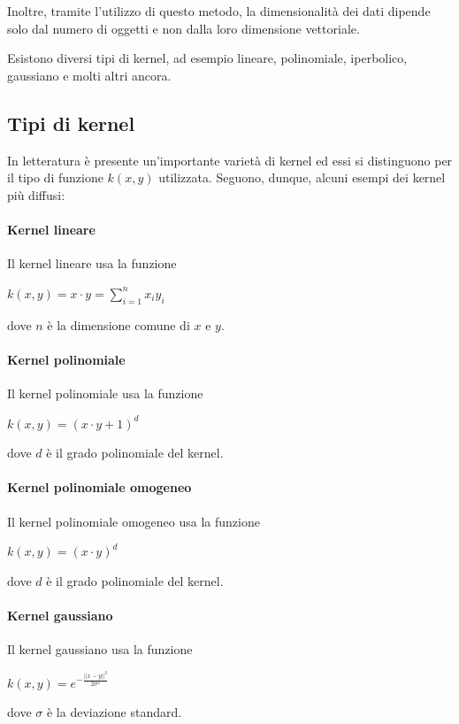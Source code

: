 \documentclass[12pt]{report}
\theoremstyle{definition}
\begin{document}
Inoltre, tramite l'utilizzo di questo metodo, la dimensionalità dei dati dipende solo dal numero di oggetti e non dalla loro dimensione vettoriale.

Esistono diversi tipi di kernel, ad esempio lineare, polinomiale, iperbolico, gaussiano e molti altri ancora.

\subsection{Tipi di kernel}
In letteratura è presente un'importante varietà di kernel ed essi si distinguono per il tipo di funzione $k(x,y)$ utilizzata. Seguono, dunque, alcuni esempi dei kernel più diffusi:

\paragraph{Kernel lineare}
Il kernel lineare usa la funzione
\begin{center}
    $k(x,y) = x \cdot y = \sum\limits_{i=1}^n x_iy_i$
\end{center}
dove $n$ è la dimensione comune di $x$ e $y$.

\paragraph{Kernel polinomiale}
Il kernel polinomiale usa la funzione
\begin{center}
    $k(x,y) = (x \cdot y + 1)^d$
\end{center}
dove $d$ è il grado polinomiale del kernel.

\paragraph{Kernel polinomiale omogeneo}
Il kernel polinomiale omogeneo usa la funzione
\begin{center}
    $k(x,y) = (x \cdot y)^d$
\end{center}
dove $d$ è il grado polinomiale del kernel.

\paragraph{Kernel gaussiano}
Il kernel gaussiano usa la funzione
\begin{center}
    $k(x,y) = e^{-\frac{||x-y||^2}{2\sigma^2}}$
\end{center}
dove $\sigma$ è la deviazione standard.
\end{document}
